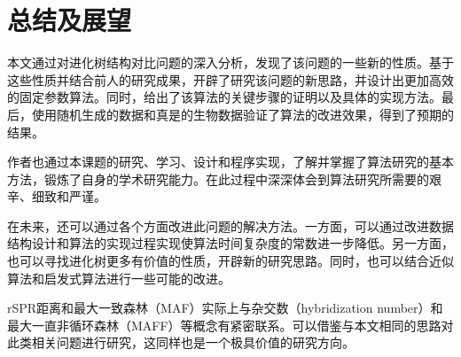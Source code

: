 
\chapter{总结及展望}
本文通过对进化树结构对比问题的深入分析，发现了该问题的一些新的性质。基于这些性质并结合前人的研究成果，开辟了研究该问题的新思路，并设计出更加高效的固定参数算法。同时，给出了该算法的关键步骤的证明以及具体的实现方法。最后，使用随机生成的数据和真是的生物数据验证了算法的改进效果，得到了预期的结果。

作者也通过本课题的研究、学习、设计和程序实现，了解并掌握了算法研究的基本方法，锻炼了自身的学术研究能力。在此过程中深深体会到算法研究所需要的艰辛、细致和严谨。

在未来，还可以通过各个方面改进此问题的解决方法。一方面，可以通过改进数据结构设计和算法的实现过程实现使算法时间复杂度的常数进一步降低。另一方面，也可以寻找进化树更多有价值的性质，开辟新的研究思路。同时，也可以结合近似算法和启发式算法进行一些可能的改进。

rSPR距离和最大一致森林（MAF）实际上与杂交数（hybridization number）和最大一直非循环森林（MAFF）等概念有紧密联系。可以借鉴与本文相同的思路对此类相关问题进行研究，这同样也是一个极具价值的研究方向。